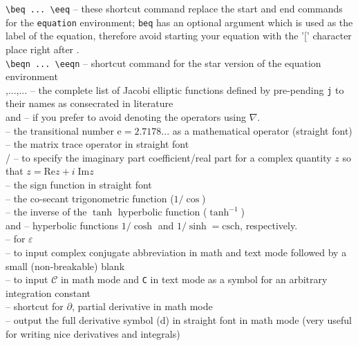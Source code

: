 \documentclass[myclassdoc,debug]{rjparticle}
\begin{document}
\noindent\texttt{\textbackslash beq ... \textbackslash eeq} -- these shortcut command replace the start and end commands for the \texttt{equation} environment; \texttt{beq} has an optional argument which is used as the label of the equation, therefore avoid starting your equation with the '[' character place right after . \\
\noindent\texttt{\textbackslash beqn ... \textbackslash eeqn} -- shortcut command for the star version of the equation environment  \\
\noindent{},...,... -- the complete list of Jacobi elliptic functions defined by pre-pending \texttt{j} to their names as consecrated in literature \\
\noindent{} and  -- if you prefer to avoid denoting the operators using $\nabla$.  \\
\noindent{} -- the transitional number $\mathrm{e} = 2.7178...$ as a mathematical operator (straight font) \\
\noindent{} -- the matrix trace operator in straight font \\
\noindent{}/ -- to specify the imaginary part coefficient/real part for a complex quantity $z$ so that  $z = \mathrm{Re} z + i\; \mathrm{Im} z$ \\
\noindent{} -- the sign function in straight font \\
\noindent{} -- the co-secant trigonometric function ($1/\cos$) \\
\noindent{} -- the inverse of the $\tanh$ hyperbolic function ($\tanh^{-1}$) \\
\noindent{} and  -- hyperbolic functions $1/\cosh$ and $1/\sinh = \mathrm{csch}$, respectively. \\
\noindent{} -- for $\varepsilon$ \\
\noindent{} -- to input complex conjugate abbreviation in math and text mode followed by a small (non-breakable) blank \\
\noindent{} -- to input $\mathcal{C}$ in math mode and \texttt{C} in text mode as a symbol for an arbitrary integration constant \\
\noindent{} -- shortcut for $\partial$, partial derivative in math mode \\
\noindent{} -- output the full derivative symbol (d) in straight font in math mode (very useful for writing nice derivatives and integrals) \\
\end{document}
